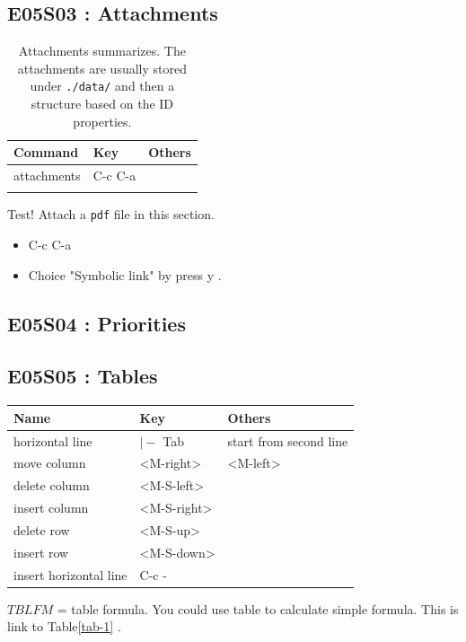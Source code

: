 \documentclass[11pt]{article}
\begin{document}
\subsection{E05S03 : Attachments}
\label{sec:org901a1d7}
\begin{table}[htbp]
\caption[attachments]{Attachments summarizes. The attachments are usually stored under \texttt{./data/} and then a structure based on the ID properties.}
\centering
\begin{tabular}{lll}
Command & Key & Others\\
\hline
attachments &  C-c C-a  & \\
 &  & \\
\end{tabular}
\end{table}

Test! Attach a \texttt{pdf} file in this section.
\begin{itemize}
\item C-c C-a
\item Choice "Symbolic link" by press  y  .
\end{itemize}

\subsection{E05S04 : Priorities}
\label{sec:orgafe9b20}
\subsection{E05S05 : Tables}
\label{sec:org404f7a4}
\begin{center}
\begin{tabular}{lll}
\hline
Name & Key & Others\\
\hline
horizontal line & \(\vert-\) Tab & start from second line\\
move column &  <M-right>  &  <M-left> \\
delete column &  <M-S-left>  & \\
insert column &  <M-S-right>  & \\
delete row &  <M-S-up>  & \\
insert row &  <M-S-down>  & \\
insert horizontal line &  C-c -  & \\
\hline
\end{tabular}
\end{center}

\(TBLFM\) = table formula. You could use table to calculate simple formula.
This is link to Table\ref{tab-1} .
\end{document}
